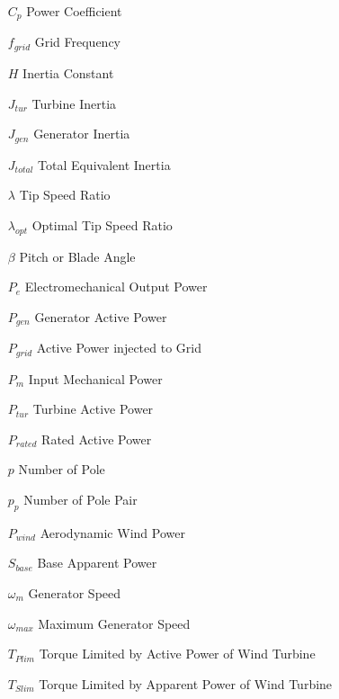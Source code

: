 
\begin{theglossary}{}
	
	\begin{itemize}[leftmargin=4.5em,align=parleft,labelsep=1cm]
		
		\item[$C_{p}$] 			Power Coefficient
		\item[$f_{grid}$] 		Grid Frequency
		\item[$H$] 				Inertia Constant
		\item[$J_{tur}$] 		Turbine Inertia
		\item[$J_{gen}$] 		Generator Inertia
		\item[$J_{total}$] 		Total Equivalent Inertia		\item[$\lambda$] 		Tip Speed Ratio
		\item[$\lambda_{opt}$]	Optimal Tip Speed Ratio
		\item[$\beta$]			Pitch or Blade Angle
		\item[$P_{e}$] 			Electromechanical Output Power
		\item[$P_{gen}$] 		Generator Active Power
		\item[$P_{grid}$] 		Active Power injected to Grid
		\item[$P_{m}$] 			Input Mechanical Power
		\item[$P_{tur}$] 		Turbine Active Power
		\item[$P_{rated}$] 		Rated Active Power		
		\item[$p$] 				Number of Pole
		\item[$p_{p}$] 			Number of Pole Pair
		\item[$P_{wind}$] 		Aerodynamic Wind Power
		\item[$S_{base}$] 		Base Apparent Power
		\item[$\omega_{m}$] 	Generator Speed
		\item[$\omega_{max}$] 	Maximum Generator Speed
		\item[$T_{Plim}$]		Torque Limited by Active Power of Wind Turbine
		\item[$T_{Slim}$] 		Torque Limited by Apparent Power of Wind Turbine
	\end{itemize}
	
\end{theglossary}